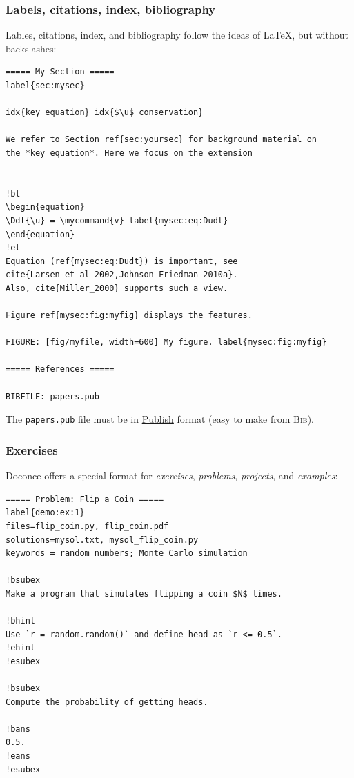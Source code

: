 \documentclass{beamer}
\begin{document}
\begin{frame}
\frametitle{Labels, citations, index, bibliography}

Lables, citations, index, and bibliography follow the ideas of
{\LaTeX}, but without backslashes:

\begin{Verbatim}[numbers=none,fontsize=\fontsize{9pt}{9pt},baselinestretch=0.95]
===== My Section =====
label{sec:mysec}

idx{key equation} idx{$\u$ conservation}

We refer to Section ref{sec:yoursec} for background material on
the *key equation*. Here we focus on the extension


!bt
\begin{equation}
\Ddt{\u} = \mycommand{v} label{mysec:eq:Dudt}
\end{equation}
!et
Equation (ref{mysec:eq:Dudt}) is important, see
cite{Larsen_et_al_2002,Johnson_Friedman_2010a}.
Also, cite{Miller_2000} supports such a view.

Figure ref{mysec:fig:myfig} displays the features.

FIGURE: [fig/myfile, width=600] My figure. label{mysec:fig:myfig}

===== References =====

BIBFILE: papers.pub
\end{Verbatim}
The \Verb!papers.pub! file must be in \href{{https://bitbucket.org/logg/publish}}{Publish}
format (easy to make from \textsc{Bib}\negthinspace{\TeX}).
\end{frame}

\begin{frame}
\frametitle{Exercises}

Doconce offers a special format for \emph{exercises}, \emph{problems}, \emph{projects},
and \emph{examples}:

\begin{Verbatim}[numbers=none,fontsize=\fontsize{9pt}{9pt},baselinestretch=0.95]
===== Problem: Flip a Coin =====
label{demo:ex:1}
files=flip_coin.py, flip_coin.pdf
solutions=mysol.txt, mysol_flip_coin.py
keywords = random numbers; Monte Carlo simulation

!bsubex
Make a program that simulates flipping a coin $N$ times.

!bhint
Use `r = random.random()` and define head as `r <= 0.5`.
!ehint
!esubex

!bsubex
Compute the probability of getting heads.

!bans
0.5.
!eans
!esubex
\end{Verbatim}
\end{frame}
\end{document}
